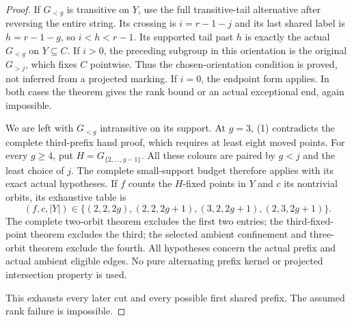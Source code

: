 \documentclass[11pt,a4paper]{article}
\begin{document}
\begin{proof}
If $G_{<g}$ is transitive on $Y$, use the full transitive-tail
alternative after reversing the entire string. Its crossing is
$i=r-1-j$ and its last shared label is $h=r-1-g$, so
$i<h<r-1$. Its supported tail past $h$ is exactly the actual
$G_{<g}$ on $Y\subseteq C$. If $i>0$, the preceding subgroup
in this orientation is the original $G_{>j}$, which fixes $C$
pointwise. Thus the chosen-orientation condition is proved,
not inferred from a projected marking. If $i=0$, the endpoint
form applies. In both cases the theorem gives the rank bound
or an actual exceptional end, again impossible.

We are left with $G_{<g}$ intransitive on its support.
At $g=3$, (1) contradicts the complete third-prefix hand proof,
which requires at least eight moved points. For every $g\ge4$,
put $H=G_{\{2,\ldots,g-1\}}$. All these colours are paired
by $g<j$ and the least choice of $j$. The complete small-support
budget therefore applies with its exact actual hypotheses.
If $f$ counts the $H$-fixed points in $Y$ and $c$ its nontrivial
orbits, its exhaustive table is
\[
 (f,c,|Y|)\in
 \{(2,2,2g),(2,2,2g+1),(3,2,2g+1),(2,3,2g+1)\}.
\]
The complete two-orbit theorem excludes the first two entries;
the third-fixed-point theorem excludes the third; the selected
ambient confinement and three-orbit theorem exclude the fourth.
All hypotheses concern the actual prefix and actual ambient
eligible edges. No pure alternating prefix kernel or projected
intersection property is used.

This exhausts every later cut and every possible first shared
prefix. The assumed rank failure is impossible.
\end{proof}
\end{document}
